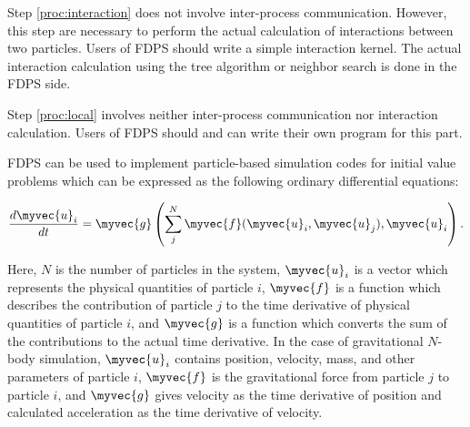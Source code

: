 Step \ref{proc:interaction} does not involve inter-process
communication. However, this step are necessary to perform the actual
calculation of interactions between two particles.  Users of FDPS
should write a simple interaction kernel. The actual interaction
calculation using the tree algorithm or neighbor search is done in the
FDPS side.


Step \ref{proc:local} involves neither inter-process communication nor
interaction calculation. Users of FDPS should and can write their own
program for this part. 



FDPS can be used to implement particle-based simulation codes for
initial value problems which can be expressed as the following
ordinary differential equations:

\begin{eqnarray}
  \frac{d\myvec{u}_i}{dt} = \myvec{g}\left(\sum_j^N \myvec{f}
  (\myvec{u}_i, \myvec{u}_j), \myvec{u}_i\right). \label{eq:geq}
\end{eqnarray}
  
Here, $N$ is the number of particles in the system, $\myvec{u}_i$ is
a vector which represents the physical quantities of  particle $i$, 
$\myvec{f}$ is a function which describes
the contribution of particle $j$ to the time derivative of
physical quantities of particle $i$, and $\myvec{g}$ is a function
which converts the sum of the contributions to the actual time
derivative. In the case of gravitational $N$-body
simulation, $\myvec{u}_i$ contains position, velocity, mass, and other
parameters of  particle $i$, $\myvec{f}$ is the gravitational force
from particle $j$ to particle $i$, and 
$\myvec{g}$ gives velocity as the time derivative of  position and
calculated acceleration as the time derivative of velocity.

